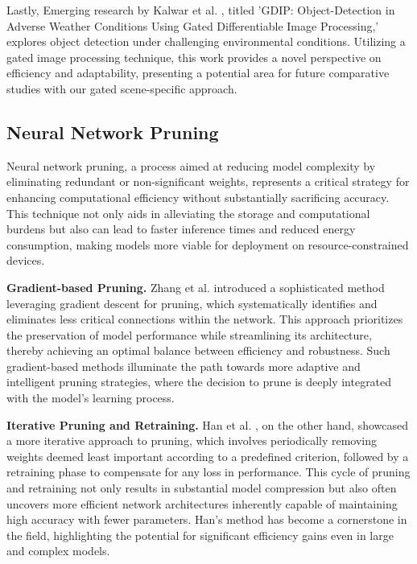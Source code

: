 Lastly, Emerging research by Kalwar et al. \cite{kalwar2023gdip}, titled 'GDIP: Object-Detection in Adverse Weather Conditions Using Gated Differentiable Image Processing,' explores object detection under challenging environmental conditions. Utilizing a gated image processing technique, this work provides a novel perspective on efficiency and adaptability, presenting a potential area for future comparative studies with our gated scene-specific approach.

\subsection{Neural Network Pruning}

Neural network pruning, a process aimed at reducing model complexity by eliminating redundant or non-significant weights, represents a critical strategy for enhancing computational efficiency without substantially sacrificing accuracy. This technique not only aids in alleviating the storage and computational burdens but also can lead to faster inference times and reduced energy consumption, making models more viable for deployment on resource-constrained devices.

\textbf{Gradient-based Pruning.} Zhang et al. \cite{zhang2023neural} introduced a sophisticated method leveraging gradient descent for pruning, which systematically identifies and eliminates less critical connections within the network. This approach prioritizes the preservation of model performance while streamlining its architecture, thereby achieving an optimal balance between efficiency and robustness. Such gradient-based methods illuminate the path towards more adaptive and intelligent pruning strategies, where the decision to prune is deeply integrated with the model's learning process.

\textbf{Iterative Pruning and Retraining.} Han et al. \cite{han2016deep}, on the other hand, showcased a more iterative approach to pruning, which involves periodically removing weights deemed least important according to a predefined criterion, followed by a retraining phase to compensate for any loss in performance. This cycle of pruning and retraining not only results in substantial model compression but also often uncovers more efficient network architectures inherently capable of maintaining high accuracy with fewer parameters. Han's method has become a cornerstone in the field, highlighting the potential for significant efficiency gains even in large and complex models.

